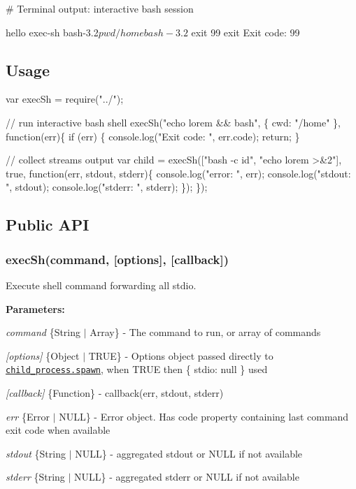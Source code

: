 \begin{DoxyCode}
# Terminal output: interactive bash session

hello exec-sh
bash-3.2$ pwd
/home
bash-3.2$ exit 99
exit
Exit code:  99
\end{DoxyCode}


\subsection*{Usage}


\begin{DoxyCode}
var execSh = require("../");

// run interactive bash shell
execSh("echo lorem && bash", \{ cwd: "/home" \}, function(err)\{
  if (err) \{
    console.log("Exit code: ", err.code);
    return;
  \}

  // collect streams output
  var child = execSh(["bash -c id", "echo lorem >&2"], true,
    function(err, stdout, stderr)\{
      console.log("error: ", err);
      console.log("stdout: ", stdout);
      console.log("stderr: ", stderr);
    \});
\});
\end{DoxyCode}


\subsection*{Public A\+PI}

\subsubsection*{exec\+Sh(command, \mbox{[}options\mbox{]}, \mbox{[}callback\mbox{]})}

Execute shell command forwarding all stdio.

{\bfseries Parameters\+:}


\begin{DoxyItemize}
\item {\itshape command} \{String $\vert$ Array\} -\/ The command to run, or array of commands
\item {\itshape \mbox{[}options\mbox{]}} \{Object $\vert$ T\+R\+UE\} -\/ Options object passed directly to \href{http://nodejs.org/api/child_process.html#child_process_child_process_spawn_command_args_options}{\tt {\ttfamily child\+\_\+process.\+spawn}}, when {\ttfamily T\+R\+UE} then {\ttfamily \{ stdio\+: null \}} used
\item {\itshape \mbox{[}callback\mbox{]}} \{Function\} -\/ {\ttfamily callback(err, stdout, stderr)}
\begin{DoxyItemize}
\item {\itshape err} \{Error $\vert$ N\+U\+LL\} -\/ Error object. Has {\ttfamily code} property containing last command exit code when available
\item {\itshape stdout} \{String $\vert$ N\+U\+LL\} -\/ aggregated stdout or {\ttfamily N\+U\+LL} if not available
\item {\itshape stderr} \{String $\vert$ N\+U\+LL\} -\/ aggregated stderr or {\ttfamily N\+U\+LL} if not available
\end{DoxyItemize}
\end{DoxyItemize}

